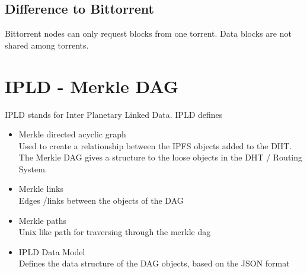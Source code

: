 \documentclass[a4paper,11pt, oneside]{report}
\theoremstyle{definition}
\begin{document}
\subsection{Difference to Bittorrent}

Bittorrent nodes can only request blocks from one torrent. Data blocks are not shared among torrents.



\newpage

\section{IPLD - Merkle DAG}
IPLD stands for Inter Planetary Linked Data. IPLD defines
\begin{itemize}
\item Merkle directed acyclic graph\\ Used to create a relationship between the IPFS objects added to the DHT. The Merkle DAG gives a structure to the loose objects in the DHT / Routing System.
\item Merkle links \\ Edges /links  between the objects of the DAG
\item Merkle paths \\ Unix like path for traversing through the merkle dag
\item IPLD Data Model \\ Defines the data structure of the DAG objects, based on the JSON format
\end{itemize}
\end{document}
